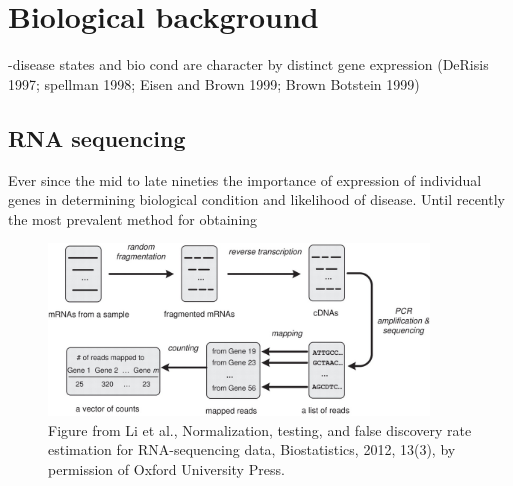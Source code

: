 \section{Biological background}
\label{sec:biol-backgr}

-disease states and bio cond are character by distinct gene expression (DeRisis 1997; spellman 1998; Eisen and Brown
1999; Brown Botstein 1999)

\subsection{RNA sequencing}
\label{sec:rna-sequencing}

Ever since the mid to late nineties the importance of expression of individual genes in determining biological condition
and {\color{red} likelihood of} disease. Until recently the most prevalent method for obtaining 

\begin{figure}
  \centering
  \includegraphics[width=0.9\textwidth]{pics/li-biostats12.jpg}
  \caption{Figure from Li et al., Normalization, testing, and false discovery rate estimation for RNA-sequencing data, Biostatistics, 2012, 13(3), by permission of Oxford University Press.}
  \label{fig:li-biostats}
\end{figure}


